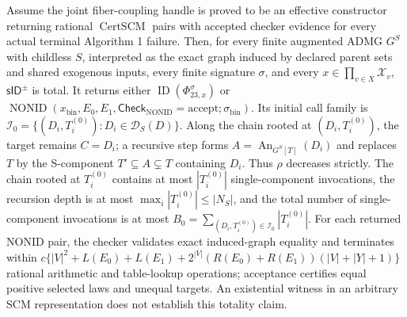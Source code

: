 Assume the joint fiber-coupling handle is proved to be an effective constructor returning rational \(\operatorname{CertSCM}\) pairs with accepted checker evidence for every actual terminal Algorithm 1 failure. Then, for every finite augmented ADMG \(G^S\) with childless \(S\), interpreted as the exact graph induced by declared parent sets and shared exogenous inputs, every finite signature \(\sigma\), and every \(x\in\prod_{v\in X}\mathcal X_v\), \(\mathsf{sID}^{\pm}\) is total. It returns either \(\operatorname{ID}(\Phi_{23,x}^{\sigma})\) or \(\operatorname{NONID}(x_{\mathrm{bin}},E_0,E_1,\mathsf{Check}_{\mathrm{NONID}}=\mathrm{accept};\sigma_{\mathrm{bin}})\). Its initial call family is \(\mathcal I_0=\{(D_i,T_i^{(0)}):D_i\in\mathcal D_S(D)\}\). Along the chain rooted at \((D_i,T_i^{(0)})\), the target remains \(C=D_i\); a recursive step forms \(A=\operatorname{An}_{G^S[T]}(D_i)\) and replaces \(T\) by the S-component \(T'\subseteq A\subsetneq T\) containing \(D_i\). Thus \(\rho\) decreases strictly. The chain rooted at \(T_i^{(0)}\) contains at most \(|T_i^{(0)}|\) single-component invocations, the recursion depth is at most \(\max_i|T_i^{(0)}|\le|N_S|\), and the total number of single-component invocations is at most \(B_0=\sum_{(D_i,T_i^{(0)})\in\mathcal I_0}|T_i^{(0)}|\). For each returned NONID pair, the checker validates exact induced-graph equality and terminates within \(c\{|V|^2+L(E_0)+L(E_1)+2^{|V|}(R(E_0)+R(E_1))(|V|+|Y|+1)\}\) rational arithmetic and table-lookup operations; acceptance certifies equal positive selected laws and unequal targets. An existential witness in an arbitrary SCM representation does not establish this totality claim.